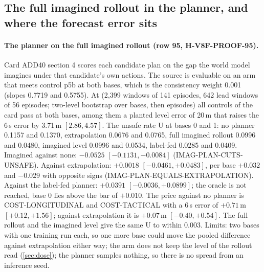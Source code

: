 \subsection{The full imagined rollout in the planner, and where the forecast error sits}\label{sec:fullimag}
\paragraph{The planner on the full imagined rollout (row 95, H-V8F-PROOF-95).} Card ADD40 section 4 scores each candidate plan on the gap the world model imagines under that candidate's own actions. The source is evaluable on an arm that meets control p5b at both bases, which is the consistency weight 0.001 (slopes 0.7719 and 0.5755). At  (2,399 windows of 141 episodes, 642 lead windows of 56 episodes; two-level bootstrap over bases, then episodes) all controls of the card pass at both bases, among them a planted level error of 20\,m that raises the 6\,s error by 3.71\,m $[2.86,4.57]$. The unsafe rate U at bases 0 and 1: no planner 0.1157 and 0.1370, extrapolation 0.0676 and 0.0765, full imagined rollout 0.0996 and 0.0480, imagined level 0.0996 and 0.0534, label-fed 0.0285 and 0.0409. Imagined against none: $-0.0525$ $[-0.1131,-0.0084]$ (IMAG-PLAN-CUTS-UNSAFE). Against extrapolation: $+0.0018$ $[-0.0461,+0.0483]$, per base $+0.032$ and $-0.029$ with opposite signs (IMAG-PLAN-EQUALS-EXTRAPOLATION). Against the label-fed planner: $+0.0391$ $[-0.0036,+0.0899]$; the oracle is not reached, base 0 lies above the bar of $+0.010$. The price against no planner is COST-LONGITUDINAL and COST-TACTICAL with a 6\,s error of $+0.71$\,m $[+0.12,+1.56]$; against extrapolation it is $+0.07$\,m $[-0.40,+0.54]$. The full rollout and the imagined level give the same U to within 0.003. Limits: two bases with one training run each, so one more base could move the pooled difference against extrapolation either way; the arm does not keep the level of the rollout read (\cref{sec:dose}); the planner samples nothing, so there is no spread from an inference seed.

